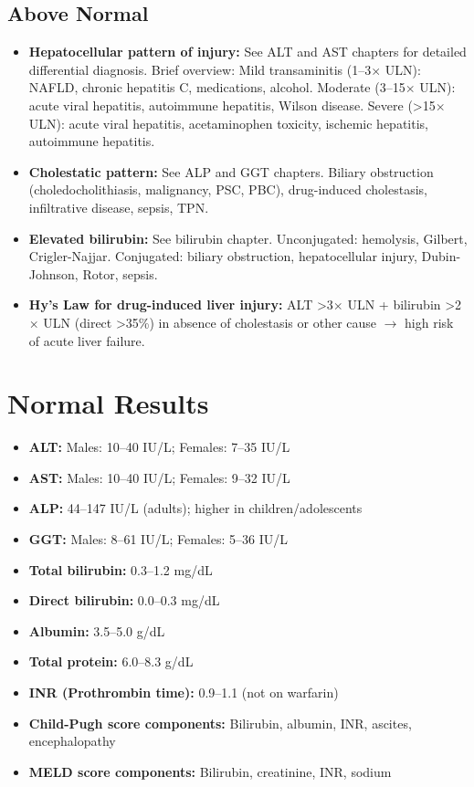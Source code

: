 \subsection*{Above Normal}
\begin{itemize}
  \item \textbf{Hepatocellular pattern of injury:} See ALT and AST chapters for detailed differential diagnosis. Brief overview: Mild transaminitis (1--3$\times$ ULN): NAFLD, chronic hepatitis C, medications, alcohol. Moderate (3--15$\times$ ULN): acute viral hepatitis, autoimmune hepatitis, Wilson disease. Severe (>15$\times$ ULN): acute viral hepatitis, acetaminophen toxicity, ischemic hepatitis, autoimmune hepatitis.
  \item \textbf{Cholestatic pattern:} See ALP and GGT chapters. Biliary obstruction (choledocholithiasis, malignancy, PSC, PBC), drug-induced cholestasis, infiltrative disease, sepsis, TPN.
  \item \textbf{Elevated bilirubin:} See bilirubin chapter. Unconjugated: hemolysis, Gilbert, Crigler-Najjar. Conjugated: biliary obstruction, hepatocellular injury, Dubin-Johnson, Rotor, sepsis.
  \item \textbf{Hy's Law for drug-induced liver injury:} ALT >3$\times$ ULN + bilirubin >2$\times$ ULN (direct >35\%) in absence of cholestasis or other cause $\rightarrow$ high risk of acute liver failure.
\end{itemize}

\section*{Normal Results}
\begin{itemize}
  \item \textbf{ALT:} Males: 10--40 IU/L; Females: 7--35 IU/L
  \item \textbf{AST:} Males: 10--40 IU/L; Females: 9--32 IU/L
  \item \textbf{ALP:} 44--147 IU/L (adults); higher in children/adolescents
  \item \textbf{GGT:} Males: 8--61 IU/L; Females: 5--36 IU/L
  \item \textbf{Total bilirubin:} 0.3--1.2 mg/dL
  \item \textbf{Direct bilirubin:} 0.0--0.3 mg/dL
  \item \textbf{Albumin:} 3.5--5.0 g/dL
  \item \textbf{Total protein:} 6.0--8.3 g/dL
  \item \textbf{INR (Prothrombin time):} 0.9--1.1 (not on warfarin)
  \item \textbf{Child-Pugh score components:} Bilirubin, albumin, INR, ascites, encephalopathy
  \item \textbf{MELD score components:} Bilirubin, creatinine, INR, sodium
\end{itemize}

